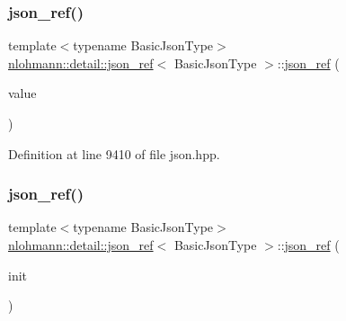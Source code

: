 \subsubsection{\texorpdfstring{json\_ref()}{json\_ref()}\hspace{0.1cm}{\footnotesize\ttfamily [2/6]}}
{\footnotesize\ttfamily template$<$typename Basic\+Json\+Type$>$ \\
\mbox{\hyperlink{classnlohmann_1_1detail_1_1json__ref}{nlohmann\+::detail\+::json\+\_\+ref}}$<$ Basic\+Json\+Type $>$\+::\mbox{\hyperlink{classnlohmann_1_1detail_1_1json__ref}{json\+\_\+ref}} (\begin{DoxyParamCaption}\item[{const \mbox{\hyperlink{classnlohmann_1_1detail_1_1json__ref_a78d76cf288141049568c0d670ed670ef}{value\+\_\+type}} \&}]{value }\end{DoxyParamCaption})\hspace{0.3cm}{\ttfamily [inline]}}



Definition at line 9410 of file json.\+hpp.

\mbox{\label{classnlohmann_1_1detail_1_1json__ref_adfba2db547283a7c6a5df9a32e72efc5}} 
\subsubsection{\texorpdfstring{json\_ref()}{json\_ref()}\hspace{0.1cm}{\footnotesize\ttfamily [3/6]}}
{\footnotesize\ttfamily template$<$typename Basic\+Json\+Type$>$ \\
\mbox{\hyperlink{classnlohmann_1_1detail_1_1json__ref}{nlohmann\+::detail\+::json\+\_\+ref}}$<$ Basic\+Json\+Type $>$\+::\mbox{\hyperlink{classnlohmann_1_1detail_1_1json__ref}{json\+\_\+ref}} (\begin{DoxyParamCaption}\item[{std\+::initializer\+\_\+list$<$ \mbox{\hyperlink{classnlohmann_1_1detail_1_1json__ref}{json\+\_\+ref}}$<$ Basic\+Json\+Type $>$ $>$}]{init }\end{DoxyParamCaption})\hspace{0.3cm}{\ttfamily [inline]}}



